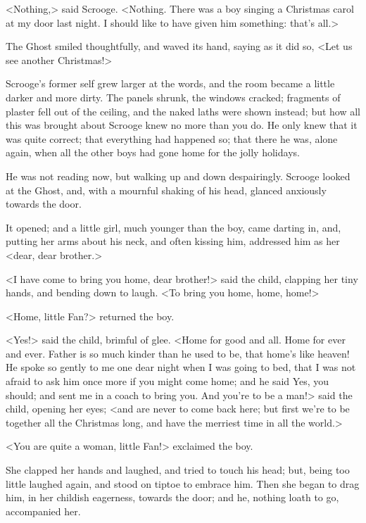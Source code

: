 <Nothing,> said Scrooge. <Nothing. There was a boy singing a Christmas carol at my door last night. I should like to have given him something: that's all.>

The Ghost smiled thoughtfully, and waved its hand, saying as it did so, <Let us see another Christmas!>

Scrooge's former self grew larger at the words, and the room became a little darker and more dirty. The panels shrunk, the windows cracked; fragments of plaster fell out of the ceiling, and the naked laths were shown instead; but how all this was brought about Scrooge knew no more than you do. He only knew that it was quite correct; that everything had happened so; that there he was, alone again, when all the other boys had gone home for the jolly holidays.

He was not reading now, but walking up and down despairingly. Scrooge looked at the Ghost, and, with a mournful shaking of his head, glanced anxiously towards the door.

It opened; and a little girl, much younger than the boy, came darting in, and, putting her arms about his neck, and often kissing him, addressed him as her <dear, dear brother.>

<I have come to bring you home, dear brother!> said the child, clapping her tiny hands, and bending down to laugh. <To bring you home, home, home!>

<Home, little Fan?> returned the boy.

<Yes!> said the child, brimful of glee. <Home for good and all. Home for ever and ever. Father is so much kinder than he used to be, that home's like heaven! He spoke so gently to me one dear night when I was going to bed, that I was not afraid to ask him once more if you might come home; and he said Yes, you should; and sent me in a coach to bring you. And you're to be a man!> said the child, opening her eyes; <and are never to come back here; but first we're to be together all the Christmas long, and have the merriest time in all the world.>

<You are quite a woman, little Fan!> exclaimed the boy.

She clapped her hands and laughed, and tried to touch his head; but, being too little laughed again, and stood on tiptoe to embrace him. Then she began to drag him, in her childish eagerness, towards the door; and he, nothing loath to go, accompanied her.

